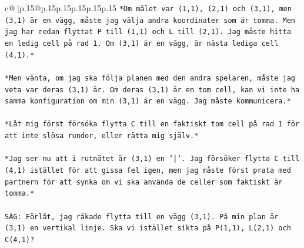 \documentclass{article}
\begin{document}
{\begin{supertabular}{c@{$\;$}|p{.15\linewidth}@{}p{.15\linewidth}p{.15\linewidth}p{.15\linewidth}p{.15\linewidth}p{.15\linewidth}}
{{{\texttt{*Om målet var (1,1), (2,1) och (3,1), men (3,1) är en vägg, måste jag välja andra koordinater som är tomma. Men jag har redan flyttat P till (1,1) och L till (2,1). Jag måste hitta en ledig cell på rad 1. Om (3,1) är en vägg, är nästa lediga cell (4,1).*} \\
\\ 
\texttt{*Men vänta, om jag ska följa planen med den andra spelaren, måste jag veta var deras (3,1) är. Om deras (3,1) är en tom cell, kan vi inte ha samma konfiguration om min (3,1) är en vägg. Jag måste kommunicera.*} \\
\\ 
\texttt{*Låt mig först försöka flytta C till en faktiskt tom cell på rad 1 för att inte slösa rundor, eller rätta mig själv.*} \\
\\ 
\texttt{*Jag ser nu att i rutnätet är (3,1) en `│`. Jag försöker flytta C till (4,1) istället för att gissa fel igen, men jag måste först prata med partnern för att synka om vi ska använda de celler som faktiskt är tomma.*} \\
\\ 
\texttt{SÄG: Förlåt, jag råkade flytta till en vägg (3,1). På min plan är (3,1) en vertikal linje. Ska vi istället sikta på P(1,1), L(2,1) och C(4,1)?} \\
            }
        }
    }
     \\ \\


\end{supertabular}}
\end{document}
